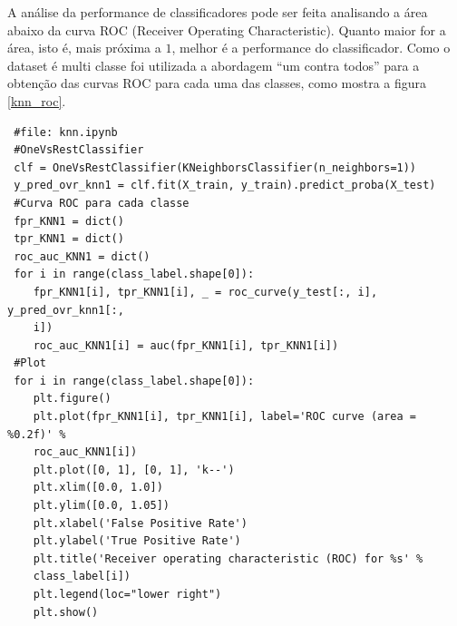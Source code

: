 \documentclass[
	article,			%
	11pt,				%
	oneside,			%
	a4paper,			%
	english,			%
	brazil,				%
	sumario=tradicional
	]{abntex2}
\begin{document}
A análise da performance de classificadores pode ser feita analisando a área abaixo da curva ROC (Receiver Operating Characteristic). Quanto maior for a área, isto é, mais próxima a $1$, melhor é a performance do classificador. Como o dataset é multi classe foi utilizada a abordagem ``um contra todos'' para a obtenção das curvas ROC para cada uma das classes, como mostra a figura \ref{knn_roc}.

\begin{verbatim}
 #file: knn.ipynb
 #OneVsRestClassifier
 clf = OneVsRestClassifier(KNeighborsClassifier(n_neighbors=1))
 y_pred_ovr_knn1 = clf.fit(X_train, y_train).predict_proba(X_test)
 #Curva ROC para cada classe
 fpr_KNN1 = dict()
 tpr_KNN1 = dict()
 roc_auc_KNN1 = dict()
 for i in range(class_label.shape[0]):
    fpr_KNN1[i], tpr_KNN1[i], _ = roc_curve(y_test[:, i], y_pred_ovr_knn1[:,
    i])
    roc_auc_KNN1[i] = auc(fpr_KNN1[i], tpr_KNN1[i])
 #Plot
 for i in range(class_label.shape[0]):
    plt.figure()
    plt.plot(fpr_KNN1[i], tpr_KNN1[i], label='ROC curve (area = %0.2f)' %
    roc_auc_KNN1[i])
    plt.plot([0, 1], [0, 1], 'k--')
    plt.xlim([0.0, 1.0])
    plt.ylim([0.0, 1.05])
    plt.xlabel('False Positive Rate')
    plt.ylabel('True Positive Rate')
    plt.title('Receiver operating characteristic (ROC) for %s' %
    class_label[i])
    plt.legend(loc="lower right")
    plt.show()
\end{verbatim}
\end{document}
